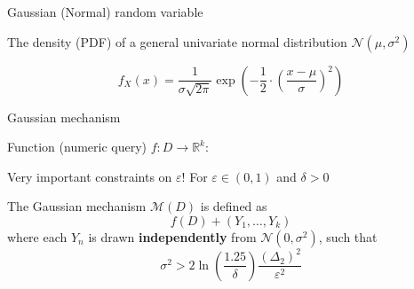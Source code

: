 \documentclass[12pt,aspectratio=169,handout]{beamer}
\begin{document}
\begin{frame}{Gaussian (Normal) random variable}

The density (PDF) of a general univariate normal distribution $\mathcal{N}(\mu, \sigma^2)$

$$
f_X(x) =
\frac{1}{\sigma \sqrt{2\pi}} \exp \left(
- \frac{1}{2} \cdot \left( \frac{x - \mu}{\sigma} \right)^2
\right)
$$


\end{frame}


\begin{frame}{Gaussian mechanism}

Function (numeric query) $f : D \rightarrow \mathbb{R}^k$:

\begin{block}{Very important constraints on $\varepsilon$!}
For $\varepsilon \in (0, 1)$ and $\delta > 0$
\end{block}


The Gaussian mechanism $\mathcal{M}(D)$ is defined as
$$
f(D) + (Y_1, \ldots, Y_k)
$$
where each $Y_n$ is drawn \textbf{independently} from $\mathcal{N}(0, \sigma^2)$, such that
$$
\sigma^2 > 2 \ln \left( \frac{1.25}{\delta} \right) \frac{(\Delta_2)^2}{\varepsilon^2}
$$

\end{frame}
\end{document}
